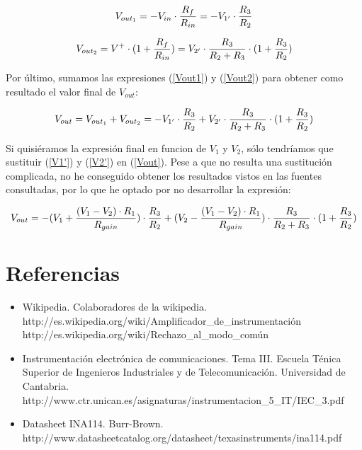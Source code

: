\documentclass[a4paper,titlepage]{article}
\begin{document}
\begin{equation}
V_{out_1} = - V_{in} \cdot {R_f \over R_{in}} = - V_{1'} \cdot {R_3 \over R_2}
\label{Vout1}
\end{equation}

\begin{equation}
V_{out_2} = V^{+} \cdot (1 + {R_f \over R_{in}}) = V_{2'} \cdot {R_3 \over {R_2 + R_3}} \cdot (1 + {R_3 \over R_2})
\label{Vout2}
\end{equation}

Por último, sumamos las expresiones (\ref{Vout1}) y (\ref{Vout2}) para obtener como resultado el valor final de $V_{out}$:

\begin{equation}
V_{out} = V_{out_1} + V_{out_2} = - V_{1'} \cdot {R_3 \over R_2} + V_{2'} \cdot {R_3 \over {R_2 + R_3}} \cdot (1 + {R_3 \over R_2})
\label{Vout}
\end{equation}

Si quisiéramos la expresión final en funcion de $V_1$ y $V_2$, sólo tendríamos que sustituir (\ref{V1'}) y (\ref{V2'}) en (\ref{Vout}). Pese a que no resulta una sustitución complicada, no he conseguido obtener
los resultados vistos en las fuentes consultadas, por lo que he optado por no desarrollar la expresión:

\begin{equation}
V_{out} = - ({V_1 + {{(V_{1} - V_{2}) \cdot {R_1}} \over {R_{gain}}} }) \cdot {R_3 \over R_2} + ({V_2 - {{(V_{1} - V_{2}) \cdot {R_1}} \over {R_{gain}}} }) \cdot {R_3 \over {R_2 + R_3}} \cdot (1 + {R_3 \over R_2})
\label{Vout_fin}
\end{equation}

\vspace{12cm}

\section*{Referencias}

\begin{itemize}
\item{Wikipedia. Colaboradores de la wikipedia.\\
\small{http://es.wikipedia.org/wiki/Amplificador\_de\_instrumentación} \\
\small{http://es.wikipedia.org/wiki/Rechazo\_al\_modo\_común}}

\item{Instrumentación electrónica de comunicaciones. Tema III. Escuela Ténica Superior de Ingenieros Industriales y de Telecomunicación. Universidad de Cantabria.\\
\small{http://www.ctr.unican.es/asignaturas/instrumentacion\_5\_IT/IEC\_3.pdf}}

\item{Datasheet INA114. Burr-Brown. \\
\small{http://www.datasheetcatalog.org/datasheet/texasinstruments/ina114.pdf}}
\end{itemize}
\end{document}
